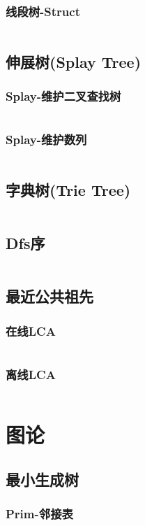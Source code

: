 \documentclass[a4paper,11pt]{article}
\begin{document}
\subsubsection{线段树-Struct}
\inputminted[breaklines]{c++}{数据结构/线段树-Struct.cpp}
\subsection{伸展树(Splay Tree)}
\subsubsection{Splay-维护二叉查找树}
\inputminted[breaklines]{c++}{数据结构/Splay-维护二叉查找树.cpp}
\subsubsection{Splay-维护数列}
\inputminted[breaklines]{c++}{数据结构/Splay-维护数列.cpp}
\subsection{字典树(Trie Tree)}
\inputminted[breaklines]{c++}{数据结构/字典树_Trie.cpp}
\subsection{Dfs序}
\inputminted[breaklines]{c++}{数据结构/Dfs序.cpp}
\subsection{最近公共祖先}
\subsubsection{在线LCA}
\inputminted[breaklines]{c++}{数据结构/在线LCA-DFS+ST.cpp}
\subsubsection{离线LCA}
\inputminted[breaklines]{c++}{数据结构/离线LCA-Tarjan.cpp}


\section{图论}
\subsection{最小生成树}
\subsubsection{Prim-邻接表}
\inputminted[breaklines]{c++}{图论/Prim-邻接表.cpp}
\end{document}

